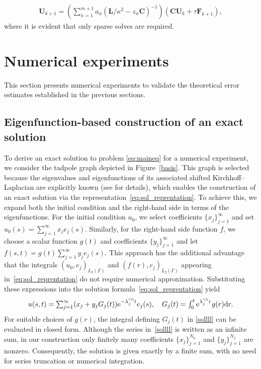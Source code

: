 \documentclass[numbers,webpdf]{ima-authoring-template}%
\theoremstyle{thmstyletwo}%
\numberwithin{equation}{section}
\begin{document}
\begin{align}
\label{thenumericalscheme}
\textstyle
\mathbf{U}_{k+1} = \left(\sum_{n=1}^{m+1} a_n\left(\mathbf{L}/\kappa^2-z_n\mathbf{C}\right)^{-1}\right) (\mathbf{C}\mathbf{U}_k+\tau \mathbf{F}_{k+1}),
\end{align}
where it is evident that only sparse solves are required.
\section{Numerical experiments} 
This section presents numerical experiments to validate the theoretical error estimates established in the previous sections.
\label{numericalimplementationsec}
\subsection{Eigenfunction-based construction of an exact solution}
To derive an exact solution to problem \eqref{eq:maineq} for a numerical experiment, we consider the tadpole graph depicted in Figure~\ref{basis}. This graph is selected because the eigenvalues and eigenfunctions of its associated shifted Kirchhoff--Laplacian are explicitly known (see \cite[Example~1]{bolin2024gaussian} for details), which enables the construction of an exact solution via the representation~\eqref{eq:sol_reprentation}. To achieve this, we expand both the initial condition and the right-hand side in terms of the eigenfunctions. For the initial condition $u_0$, we select coefficients $\{x_j\}_{j=1}^{\infty}$ and set $u_0(s) = \sum_{j=1}^{\infty}x_je_j(s)$. Similarly, for the right-hand side function $f$, we choose a scalar function $g(t)$ and coefficients $\{y_j\}_{j=1}^{\infty}$ and let $f(s,t) = g(t)\sum_{j=1}^{\infty} y_j e_j(s)$. This approach has the additional advantage that the integrals $\left(u_0, e_j\right)_{L_2(\Gamma)}$ and $\left(f(r), e_j\right)_{L_2(\Gamma)}$ appearing in~\eqref{eq:sol_reprentation} do not require numerical approximation. Substituting these expressions into the solution formula~\eqref{eq:sol_reprentation} yield
\begin{align}
\label{sollll}
    u(s,t) = \textstyle\sum_{j=1}^{\infty}(x_j+y_j G_j(t))\mathrm{e}^{-\lambda^{\sfrac{\alpha}{2}}_jt}e_j(s),\quad G_j(t)= \int_0^t \mathrm{e}^{\lambda^{\sfrac{\alpha}{2}}_jr}g(r)\dd r.
\end{align}
For suitable choices of $g(r)$, the integral defining $G_j(t)$ in \eqref{sollll} can be evaluated in closed form. Although the series in~\eqref{sollll} is written as an infinite sum, in our construction only finitely many coefficients $\{x_j\}_{j=1}^{N_0}$ and $\{y_j\}_{j=1}^{N_f}$ are nonzero. Consequently, the solution is given exactly by a finite sum, with no need for series truncation or numerical integration. 
\end{document}
